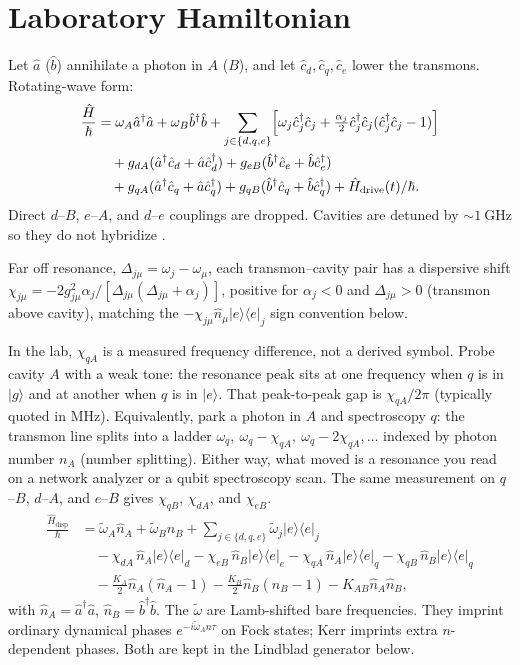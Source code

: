 \documentclass[11pt]{article}
\newcommand{\Pe}[1]{\lvert e\rangle\!\langle e\rvert_{#1}}
\begin{document}
\section{Laboratory Hamiltonian}

Let $\hat{a}$ ($\hat{b}$) annihilate a photon in $A$ ($B$), and let
$\hat{c}_d,\hat{c}_q,\hat{c}_e$ lower the transmons.  Rotating-wave form:
\begin{align}
\frac{\hat{H}}{\hbar}
&=\omega_A\hat{a}^\dagger\hat{a}+\omega_B\hat{b}^\dagger\hat{b}
 +\sum_{j\in\{d,q,e\}}
  \Bigl[\omega_j\hat{c}_j^\dagger\hat{c}_j
        +\tfrac{\alpha_j}{2}\hat{c}_j^\dagger\hat{c}_j
         (\hat{c}_j^\dagger\hat{c}_j-1)\Bigr]
\nonumber\\
&\quad
 +g_{dA}(\hat{a}^\dagger\hat{c}_d+\hat{a}\hat{c}_d^\dagger)
 +g_{eB}(\hat{b}^\dagger\hat{c}_e+\hat{b}\hat{c}_e^\dagger)
\nonumber\\
&\quad
 +g_{qA}(\hat{a}^\dagger\hat{c}_q+\hat{a}\hat{c}_q^\dagger)
 +g_{qB}(\hat{b}^\dagger\hat{c}_q+\hat{b}\hat{c}_q^\dagger)
 +\hat{H}_{\mathrm{drive}}(t)/\hbar .
\label{eq:lab}
\end{align}
Direct $d$--$B$, $e$--$A$, and $d$--$e$ couplings are dropped.  Cavities are
detuned by $\sim 1~\mathrm{GHz}$ so they do not hybridize \cite{Gao2018}.

Far off resonance, $\Delta_{j\mu}=\omega_j-\omega_\mu$, each transmon--cavity
pair has a dispersive shift
$\chi_{j\mu}=-2g_{j\mu}^2\alpha_j/[\Delta_{j\mu}(\Delta_{j\mu}+\alpha_j)]$,
positive for $\alpha_j<0$ and $\Delta_{j\mu}>0$ (transmon above cavity),
matching the $-\chi_{j\mu}\hat{n}_\mu\Pe{j}$ sign convention below.

In the lab, $\chi_{qA}$ is a measured frequency difference, not a derived
symbol.  Probe cavity $A$ with a weak tone: the resonance peak sits at one
frequency when $q$ is in $\lvert g\rangle$ and at another when $q$ is in
$\lvert e\rangle$.  That peak-to-peak gap is $\chi_{qA}/2\pi$ (typically
quoted in $\mathrm{MHz}$).  Equivalently, park a photon in $A$ and
spectroscopy $q$: the transmon line splits into a ladder
$\omega_q,\ \omega_q-\chi_{qA},\ \omega_q-2\chi_{qA},\ldots$ indexed by
photon number $n_A$ (number splitting).  Either way, what moved is a
resonance you read on a network analyzer or a qubit spectroscopy scan.
The same measurement on $q$--$B$, $d$--$A$, and $e$--$B$ gives
$\chi_{qB}$, $\chi_{dA}$, and $\chi_{eB}$.
\begin{align}
\frac{\hat{H}_{\mathrm{disp}}}{\hbar}
&=\widetilde\omega_A\hat{n}_A+\widetilde\omega_B\hat{n}_B
 +\sum_{j\in\{d,q,e\}}\widetilde\omega_j\Pe{j}
\nonumber\\
&\quad
 -\chi_{dA}\,\hat{n}_A\Pe{d}
 -\chi_{eB}\,\hat{n}_B\Pe{e}
 -\chi_{qA}\,\hat{n}_A\Pe{q}
 -\chi_{qB}\,\hat{n}_B\Pe{q}
\nonumber\\
&\quad
 -\tfrac{K_A}{2}\hat{n}_A(\hat{n}_A-1)
 -\tfrac{K_B}{2}\hat{n}_B(\hat{n}_B-1)
 -K_{AB}\hat{n}_A\hat{n}_B ,
\label{eq:disp}
\end{align}
with $\hat{n}_A=\hat{a}^\dagger\hat{a}$, $\hat{n}_B=\hat{b}^\dagger\hat{b}$.
The $\widetilde\omega$ are Lamb-shifted bare frequencies.  They imprint
ordinary dynamical phases $e^{-i\widetilde\omega_A n\tau}$ on Fock states;
Kerr imprints extra $n$-dependent phases.  Both are kept in the Lindblad
generator below.
\end{document}
